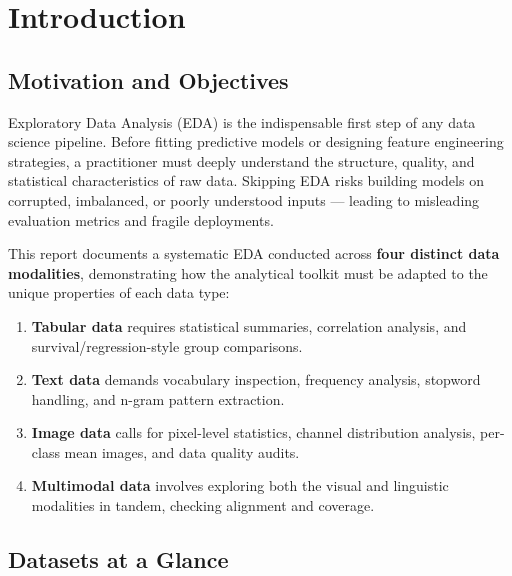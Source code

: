 \section*{Introduction}
\label{sec:intro}

\subsection*{Motivation and Objectives}
Exploratory Data Analysis (EDA) is the indispensable first step of any data science pipeline. Before fitting predictive models or designing feature engineering strategies, a practitioner must deeply understand the structure, quality, and statistical characteristics of raw data. Skipping EDA risks building models on corrupted, imbalanced, or poorly understood inputs — leading to misleading evaluation metrics and fragile deployments.

This report documents a systematic EDA conducted across \textbf{four distinct data modalities}, demonstrating how the analytical toolkit must be adapted to the unique properties of each data type:

\begin{enumerate}
    \item \textbf{Tabular data} requires statistical summaries, correlation analysis, and survival/regression-style group comparisons.
    \item \textbf{Text data} demands vocabulary inspection, frequency analysis, stopword handling, and n-gram pattern extraction.
    \item \textbf{Image data} calls for pixel-level statistics, channel distribution analysis, per-class mean images, and data quality audits.
    \item \textbf{Multimodal data} involves exploring both the visual and linguistic modalities in tandem, checking alignment and coverage.
\end{enumerate}

\subsection*{Datasets at a Glance}

